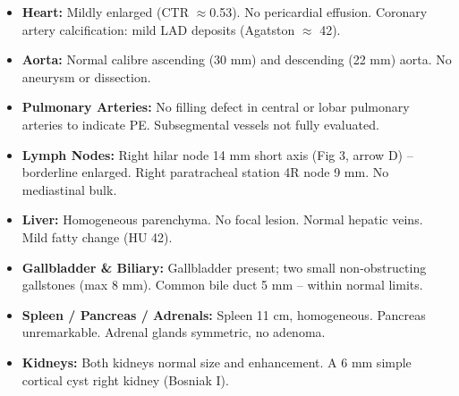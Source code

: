 \documentclass[11pt,a4paper]{article}
\newcommand{\findingbullet}[1]{%
  \item \small #1%
}
\begin{document}
\noindent
\begin{minipage}[t]{0.49\linewidth}
\begin{tcolorbox}[tealbox, title={\faHeart\hspace{4pt}Mediastinum \& Cardiovascular}]
\vspace{4pt}
\begin{itemize}[leftmargin=12pt, itemsep=3pt, parsep=0pt]
  \findingbullet{\textbf{Heart:} Mildly enlarged (CTR $\approx$0.53). No pericardial effusion. Coronary artery calcification: mild LAD deposits (Agatston $\approx$ 42).}
  \findingbullet{\textbf{Aorta:} Normal calibre ascending (30 mm) and descending (22 mm) aorta. No aneurysm or dissection.}
  \findingbullet{\textbf{Pulmonary Arteries:} No filling defect in central or lobar pulmonary arteries to indicate PE. Subsegmental vessels not fully evaluated.}
  \findingbullet{\textbf{Lymph Nodes:} Right hilar node 14 mm short axis (Fig 3, arrow D) -- borderline enlarged. Right paratracheal station 4R node 9 mm. No mediastinal bulk.}
\end{itemize}
\vspace{4pt}
\end{tcolorbox}
\end{minipage}%
\hfill
\par
\begin{minipage}[t]{0.49\linewidth}
\begin{tcolorbox}[tealbox, title={\faStethoscope\hspace{4pt}Upper Abdomen (Limited)}]
\vspace{4pt}
\begin{itemize}[leftmargin=12pt, itemsep=3pt, parsep=0pt]
  \findingbullet{\textbf{Liver:} Homogeneous parenchyma. No focal lesion. Normal hepatic veins. Mild fatty change (HU 42).}
  \findingbullet{\textbf{Gallbladder \& Biliary:} Gallbladder present; two small non-obstructing gallstones (max 8 mm). Common bile duct 5 mm -- within normal limits.}
  \findingbullet{\textbf{Spleen / Pancreas / Adrenals:} Spleen 11 cm, homogeneous. Pancreas unremarkable. Adrenal glands symmetric, no adenoma.}
  \findingbullet{\textbf{Kidneys:} Both kidneys normal size and enhancement. A 6 mm simple cortical cyst right kidney (Bosniak I).}
\end{itemize}
\vspace{4pt}
\end{tcolorbox}
\end{minipage}

\vspace{8pt}
\end{document}
